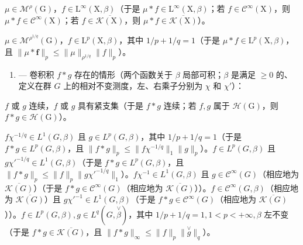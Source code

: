 \(\mu \in \mathcal{M}^{\rho}(\mathrm{G})\)，\(f\in \mathrm{L}^{\infty}(\mathrm{X},\beta)\)（于是 \(\mu *f\in \mathrm{L}^{\infty}(\mathrm{X},\beta)\)；若 \(f\in \mathcal{C}^{\infty}(\mathrm{X})\)，则 \(\mu *f\in \mathcal{C}^{\infty}(\mathrm{X})\)；若 \(f\in \overline{\mathcal{K}(\mathrm{X})}\)，则 \(\mu *f\in \overline{\mathcal{K}(\mathrm{X})}\)）。

\(\mu \in \mathcal{M}^{\rho^{1 / q}}(\mathrm{G})\)，\(f\in \mathrm{L}^p (\mathrm{X},\beta)\)，其中 \(1 / p + 1 / q = 1\)（于是 \(\mu *f\in \mathrm{L}^p (\mathrm{X},\beta)\)，且 \(\| \mu *\boldsymbol {f}\| _p\leqslant \| \mu \|_{\rho^{1 / q}}\| f\| _p\)）。

\begin{enumerate}
\def\labelenumi{\Roman{enumi}.}
\setcounter{enumi}{2}
\tightlist
\item
  --- 卷积积 \(f * g\) 存在的情形（两个函数关于 \(\beta\) 局部可积；\(\beta\) 是满足 \(\geqslant 0\) 的、定义在群 \(G\) 上的相对不变测度，左、右乘子分别为 \(\chi\) 和 \(\chi'\)）：
\end{enumerate}

\(f\) 或 \(g\) 连续，\(f\) 或 \(g\) 具有紧支集（于是 \(f*g\) 连续；若 \(f,g\) 属于 \(\mathcal{H}(\mathrm{G})\)，则 \(f*g\in\mathcal{H}(\mathrm{G})\)）。

\(f\chi^{-1/q} \in L^{1}(G,\beta)\) 且 \(g \in L^{p}(G,\beta)\)，其中 \(1/p + 1/q = 1\)（于是 \(f*g \in L^{p}(G,\beta)\)，且 \(\|f*g\|_{p} \leqslant \|f\chi^{-1/q}\|_{1} \|g\|_{p}\)）。\(f \in L^{p}(G,\beta)\) 且 \(g\chi'^{-1/q} \in L^{1}(G,\beta)\)（于是 \(f*g \in L^{p}(G,\beta)\)，且 \(\|f*g\|_{p} \leqslant \|f\|_{p} \|g\chi'^{-1/q}\|_{1}\)）。\(f\chi^{-1} \in L^{1}(G,\beta)\) 且 \(g \in \mathcal{C}^{\infty}(G)\)（相应地为 \(\overline{\mathcal{K}(G)}\)）（于是 \(f*g \in \mathcal{C}^{\infty}(G)\)（相应地为 \(\overline{\mathcal{K}(G)}\)））。\(f \in \mathcal{C}^{\infty}(G,\beta)\)（相应地为 \(\overline{\mathcal{K}(G)}\)）且 \(g\chi'^{-1} \in L^{1}(G,\beta)\)（于是 \(f*g \in \mathcal{C}^{\infty}(G)\)（相应地为 \(\overline{\mathcal{K}(G)}\)））。\(f \in L^{p}(G,\beta), g \in L^{q}(G, \overset{\vee}{\beta})\)，其中 \(1/p + 1/q = 1, 1 < p < +\infty, \beta\) 左不变（于是 \(f*g \in \overline{\mathcal{K}(G)}\)，且 \(\|f*g\|_{\infty} \leqslant \|f\|_{p} \| \overset{\vee}{g}\|_{q}\)）。
